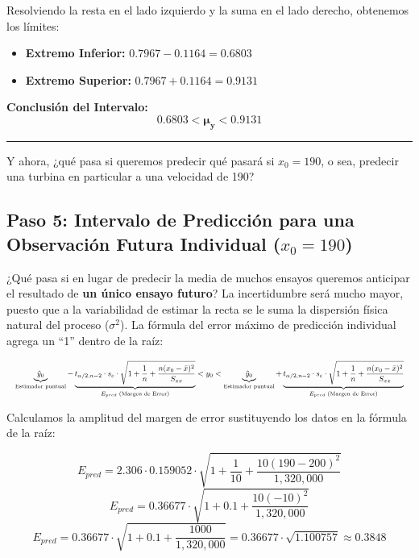 \documentclass[11pt,a4paper]{article}
\begin{document}
\vspace{0.3cm}
Resolviendo la resta en el lado izquierdo y la suma en el lado derecho, obtenemos los límites:
\begin{itemize}
    \item \textbf{Extremo Inferior:} $0.7967 - 0.1164 = 0.6803$
    \item \textbf{Extremo Superior:} $0.7967 + 0.1164 = 0.9131$
\end{itemize}

\vspace{0.3cm}
\noindent \textbf{Conclusión del Intervalo:}
\[
\mathbf{0.6803 < \mu_y < 0.9131}
\]

\vspace{0.8cm}
\hrule
\vspace{0.8cm}

Y ahora, ¿qué pasa si queremos predecir qué pasará si $x_0 = 190$, o sea, predecir una turbina en particular a una velocidad de 190?

\vspace{0.6cm}
\subsection*{Paso 5: Intervalo de Predicción para una Observación Futura Individual ($x_0 = 190$)}

¿Qué pasa si en lugar de predecir la media de muchos ensayos queremos anticipar el resultado de \textbf{un único ensayo futuro}? La incertidumbre será mucho mayor, puesto que a la variabilidad de estimar la recta se le suma la dispersión física natural del proceso ($\sigma^2$). La fórmula del error máximo de predicción individual agrega un ``1'' dentro de la raíz:

\[
\resizebox{\textwidth}{!}{$\displaystyle
\underbrace{\hat{y}_0}_{\text{Estimador puntual}} - \underbrace{t_{\alpha/2, n-2} \cdot s_e \cdot \sqrt{1 + \frac{1}{n} + \frac{n(x_0 - \bar{x})^2}{S_{xx}}}}_{E_{pred} \text{ (Margen de Error)}} < y_0 < \underbrace{\hat{y}_0}_{\text{Estimador puntual}} + \underbrace{t_{\alpha/2, n-2} \cdot s_e \cdot \sqrt{1 + \frac{1}{n} + \frac{n(x_0 - \bar{x})^2}{S_{xx}}}}_{E_{pred} \text{ (Margen de Error)}}
$}
\]

\vspace{0.2cm}
\noindent Calculamos la amplitud del margen de error sustituyendo los datos en la fórmula de la raíz:

\[
E_{pred} = 2.306 \cdot 0.159052 \cdot \sqrt{1 + \frac{1}{10} + \frac{10(190 - 200)^2}{1,320,000}}
\]
\[
E_{pred} = 0.36677 \cdot \sqrt{1 + 0.1 + \frac{10(-10)^2}{1,320,000}}
\]
\[
E_{pred} = 0.36677 \cdot \sqrt{1 + 0.1 + \frac{1000}{1,320,000}} = 0.36677 \cdot \sqrt{1.100757} \approx \mathbf{0.3848}
\]
\end{document}
